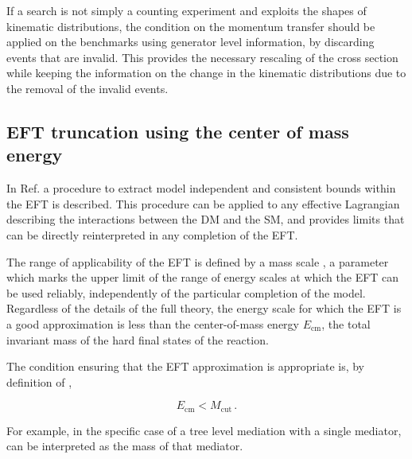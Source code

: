If a search is not simply a counting experiment and exploits the shapes of kinematic distributions, the condition on the momentum transfer should be applied on the benchmarks using generator level information, by discarding events that are invalid. This provides the necessary rescaling of the cross section while keeping the information on the change in the kinematic distributions due to the removal of the invalid events. 

\clearpage

\subsection{EFT truncation using the center of mass energy}
\label{sec:TruncationWithSHat}

In Ref.\cite{Racco:2015dxa} a procedure to extract model independent and consistent bounds within the EFT is described. This procedure can be applied to any effective Lagrangian describing the interactions between the DM and the SM, and provides limits that can be directly reinterpreted in any completion of the EFT.

The range of applicability of the EFT is defined by a mass scale \Mcut, a parameter which marks the upper limit of the range of energy scales at which the EFT can be used reliably, independently of the particular completion of the model. 
Regardless of the  details of the full theory, the energy scale for which the EFT is a good approximation is less than the center-of-mass energy $E_\text{cm}$, the total invariant mass of the hard final states of the reaction.%


The condition ensuring that the EFT approximation is appropriate is, by definition of \Mcut,

\begin{equation}
\label{Ecm<Mcut}
E_\text{cm}<M_\text{cut}\,.
\end{equation}

For example, in the specific case of a tree level mediation with a single mediator, \Mcut can be interpreted as the mass of that mediator.

